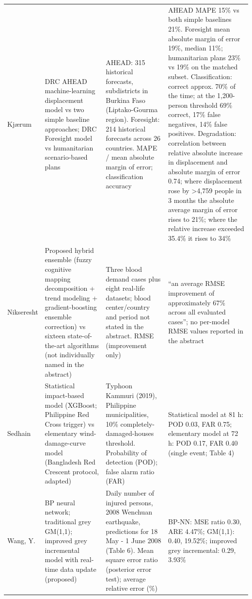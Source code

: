 \begin{longtable}{@{}L{2.0cm}L{3.6cm}L{3.6cm}L{5.4cm}@{}}
Kj\ae{}rum \cite{Kjaerum2025DisplacementAnticipatory} & DRC AHEAD machine-learning displacement model vs two simple baseline approaches; DRC Foresight model vs humanitarian scenario-based plans & AHEAD: 315 historical forecasts, subdistricts in Burkina Faso (Liptako-Gourma region). Foresight: 214 historical forecasts across 26 countries. MAPE / mean absolute margin of error; classification accuracy & AHEAD MAPE 15\% vs both simple baselines 21\%. Foresight mean absolute margin of error 19\%, median 11\%; humanitarian plans 23\% vs 19\% on the matched subset. Classification: correct approx. 70\% of the time; at the 1,200-person threshold 69\% correct, 17\% false negatives, 14\% false positives. Degradation: correlation between relative absolute increase in displacement and absolute margin of error 0.74; where displacement rose by >4,759 people in 3 months the absolute average margin of error rises to 21\%; where the relative increase exceeded 35.4\% it rises to 34\% \\[2pt]
Nikseresht \cite{Nikseresht2025BloodDemandEnsemble} & Proposed hybrid ensemble (fuzzy cognitive mapping decomposition + trend modeling + gradient-boosting ensemble correction) vs sixteen state-of-the-art algorithms (not individually named in the abstract) & Three blood demand cases plus eight real-life datasets; blood center/country and period not stated in the abstract. RMSE (improvement only) & ``an average RMSE improvement of approximately 67\% across all evaluated cases''; no per-model RMSE values reported in the abstract \\[2pt]
Sedhain \cite{Sedhain2025ImpactBasedCycloneForecasting} & Statistical impact-based model (XGBoost; Philippine Red Cross trigger) vs elementary wind-damage-curve model (Bangladesh Red Crescent protocol, adapted) & Typhoon Kammuri (2019), Philippine municipalities, 10\% completely-damaged-houses threshold. Probability of detection (POD); false alarm ratio (FAR) & Statistical model at 81 h: POD 0.03, FAR 0.75; elementary model at 72 h: POD 0.17, FAR 0.40 (single event; Table 4) \\[2pt]
Wang, Y. \cite{Wang2026EmergencySuppliesScheduling} & BP neural network; traditional grey GM(1,1); improved grey incremental model with real-time data update (proposed) & Daily number of injured persons, 2008 Wenchuan earthquake, predictions for 18 May - 1 June 2008 (Table 6). Mean square error ratio (posterior error test); average relative error (\%) & BP-NN: MSE ratio 0.30, ARE 4.47\%; GM(1,1): 0.40, 19.52\%; improved grey incremental: 0.29, 3.93\% \\[2pt]

\end{longtable}
